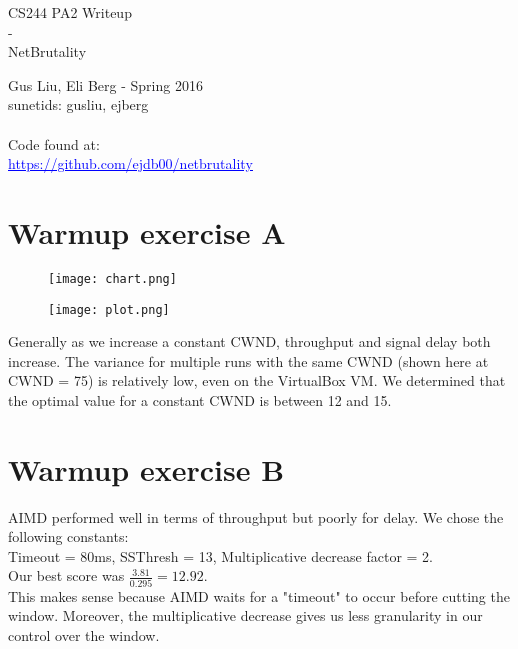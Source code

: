 \documentclass[12pt]{article}
\begin{document}
\begin{center}
{\Large CS244 PA2 Writeup\\}
-\\
{\Large NetBrutality}
\begin{center}
Gus Liu, Eli Berg - Spring 2016 \\
sunetids: gusliu, ejberg \\ 
\hspace{1cm}\\ 
Code found at: \\
\href{https://github.com/ejdb00/netbrutality}{\textcolor{blue}{\underline{https://github.com/ejdb00/netbrutality}}}
\end{center} 
\end{center}

\section*{Warmup exercise A}

\begin{figure}[h!]
  \texttt{[image: chart.png]}
\end{figure}
\begin{figure}[h!]
  \texttt{[image: plot.png]}
\end{figure}

Generally as we increase a constant CWND, throughput and signal delay both increase. The variance for multiple runs with the same CWND (shown here at CWND = 75) is relatively low, even on the VirtualBox VM. We determined that the optimal value for a constant CWND is between 12 and 15.
	
	
	\pagebreak[4]
\section*{Warmup exercise B}
AIMD performed well in terms of throughput but poorly for delay. We chose the following constants:\\
Timeout = 80ms, 
SSThresh = 13, 
Multiplicative decrease factor = 2.\\
Our best score was $\frac{3.81}{0.295} = 12.92$. \\

This makes sense because AIMD waits for a "timeout" to occur before cutting the window. Moreover, the multiplicative decrease gives us less granularity in our control over the window. 
	
\end{document}
